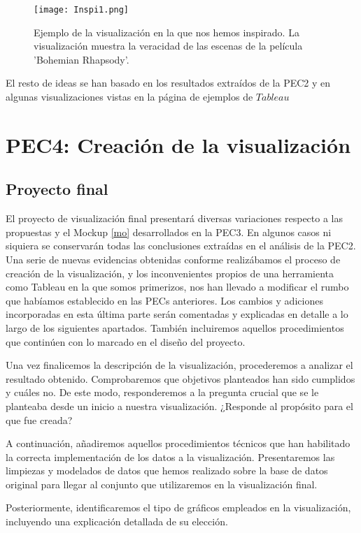 \documentclass[11pt]{article}
\begin{document}
\begin{figure}[h]
\texttt{[image: Inspi1.png]}
\caption{Ejemplo de la visualización en la que nos hemos inspirado. La visualización muestra la veracidad de las escenas de la película 'Bohemian Rhapsody'.}
\end{figure}

El resto de ideas se han basado en los resultados extraídos de la PEC2 y en algunas visualizaciones vistas en la página de ejemplos de $\textit{Tableau}$ \cite{tab}

\section{PEC4: Creación de la visualización} \label{PEC4}

\subsection{Proyecto final}

El proyecto de visualización final presentará diversas variaciones respecto a las propuestas y el Mockup \ref{mo}
desarrollados en la PEC3. En algunos casos ni siquiera se conservarán todas las conclusiones extraídas en el análisis de la PEC2. Una serie de nuevas evidencias obtenidas conforme realizábamos el proceso de creación de la visualización, y los inconvenientes propios de una herramienta como Tableau en la que somos primerizos, nos han llevado a modificar el rumbo que habíamos establecido en las PECs anteriores. Los cambios y adiciones incorporadas en esta última parte serán comentadas y explicadas en detalle a lo largo de los siguientes apartados. También incluiremos aquellos procedimientos que  continúen con lo marcado en el diseño del proyecto.

Una vez finalicemos la descripción de la visualización, procederemos a analizar el resultado obtenido. Comprobaremos que objetivos planteados han sido cumplidos y cuáles no. De este modo, responderemos a la pregunta crucial que se le planteaba desde un inicio a nuestra visualización. ¿Responde al propósito para el que fue creada?

A continuación, añadiremos aquellos procedimientos técnicos que han habilitado la correcta implementación de los datos a la visualización. Presentaremos las limpiezas y modelados de datos que hemos realizado sobre la base de datos original para llegar al conjunto que utilizaremos en la visualización final.

Posteriormente, identificaremos el tipo de gráficos empleados en la visualización, incluyendo una explicación detallada de su elección.
\end{document}
